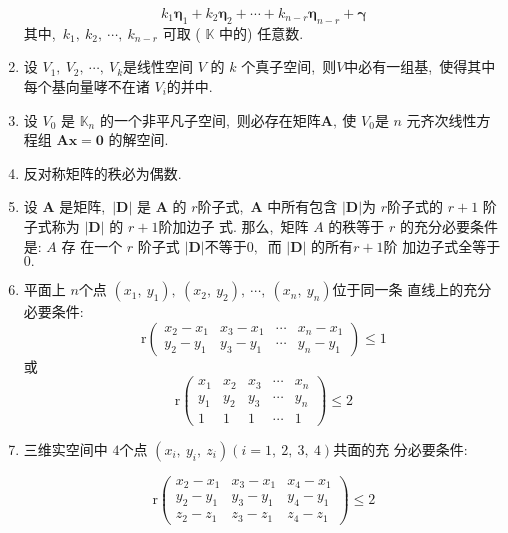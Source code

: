 \begin{enumerate}
		$$k_{1} \boldsymbol{\eta}_{1}+k_{2} \boldsymbol{\eta}_{2}+\cdots+k_{n-r} \boldsymbol{\eta}_{n-r}+\boldsymbol{\gamma}$$
		其中,\ $  k_{1},\  k_{2},\  \cdots,\  k_{n-r} $ 可取 (  $\mathbb{K}$  中的) 任意数.
		\item 设  $V_{1},\  V_{2},\  \cdots,\  V_{k}  $是线性空间  $V $ 的  $k$  个真子空间,\ 则$  V  $中必有一组基,\  使得其中每个基向量哮不在诸 $ V_{i}  $的并中.
		\item 设 $ V_{0}$  是  $\mathbb{K}_{n} $ 的一个非平凡子空间,\  则必存在矩阵$  \boldsymbol{A} ,\  $使 $ V_{0}  $是 $ n$ 元齐次线性方程组  $\boldsymbol{A x}=\mathbf{0} $ 的解空间.
		\item 反对称矩阵的秩必为偶数.
		\item 设  $\boldsymbol{A} $ 是矩阵,\  $ |\boldsymbol{D}| $ 是 $ \boldsymbol{A} $ 的 $ r  $阶子式,\  $ \boldsymbol{A}$  中所有包含  $|\boldsymbol{D}|  $为 $ r  $阶子式的  $r+1 $ 阶子式称为  $|\boldsymbol{D}| $ 的  $r+1  $阶加边子 式. 那么,\  矩阵  $A$  的秩等于 $ r $ 的充分必要条件是: $ A $ 存 在一个 $ r$  阶子式 $ |\boldsymbol{D}|  $不等于$ 0 ,\ $ 而  $|\boldsymbol{D}|$  的所有$  r+1  $阶 加边子式全等于$ 0 .$
		\item 平面上 $ n  $个点 $ \left(x_{1},\  y_{1}\right),\ \left(x_{2},\  y_{2}\right),\  \cdots,\ \left(x_{n},\  y_{n}\right) $位于同一条 直线上的充分必要条件:
		$$\mathrm{r}\left(\begin{array}{llll}
			x_{2}-x_{1} & x_{3}-x_{1} & \cdots & x_{n}-x_{1} \\
			y_{2}-y_{1} & y_{3}-y_{1} & \cdots & y_{n}-y_{1}
		\end{array}\right) \leqslant 1$$
		或
		$$\mathrm{r}\left(\begin{array}{ccccc}
			x_{1} & x_{2} & x_{3} & \cdots & x_{n} \\
			y_{1} & y_{2} & y_{3} & \cdots & y_{n} \\
			1 & 1 & 1 & \cdots & 1
		\end{array}\right) \leqslant 2$$
		\item 三维实空间中 $4 $个点  $\left(x_{i},\  y_{i},\  z_{i}\right)(i=1,\ 2,\ 3,\ 4)  $共面的充 分必要条件:
		
		$$\mathrm{r}\left(\begin{array}{lll}
			x_{2}-x_{1} & x_{3}-x_{1} & x_{4}-x_{1} \\
			y_{2}-y_{1} & y_{3}-y_{1} & y_{4}-y_{1} \\
			z_{2}-z_{1} & z_{3}-z_{1} & z_{4}-z_{1}
		\end{array}\right) \leqslant 2$$
		

\end{enumerate}
